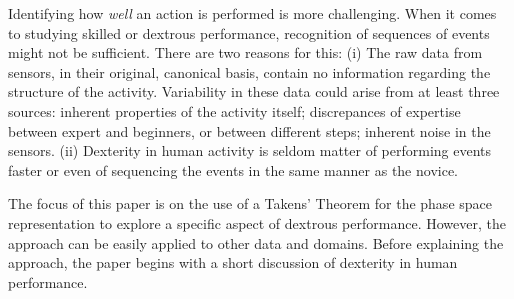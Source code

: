 \documentclass{sigchi}
\begin{document}
Identifying how \textit{well} an action is performed is more challenging. 
When it comes to studying skilled or dextrous performance, recognition of sequences of events 
might not be sufficient. 
There are two reasons for this:
(i) The raw data from sensors, in their original, canonical basis, contain no information regarding the structure of
the activity. Variability in these data could arise from at least three sources:
inherent properties of the activity itself;
discrepances of expertise between expert and beginners, or between different steps;
inherent noise in the sensors.
(ii) Dexterity in human activity is seldom matter of performing events 
faster or even of sequencing the events in the same manner as the novice. 



The focus of this paper is on the use of a Takens' Theorem for the phase space representation 
to explore a specific aspect of dextrous performance. 
However, the approach can be easily applied to other data and domains. 
Before explaining the approach, the paper begins with a short discussion of dexterity in human performance. 
\end{document}
